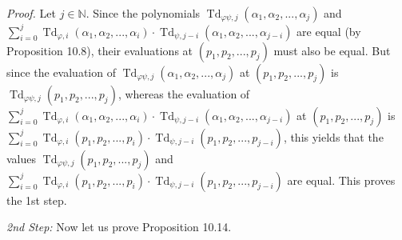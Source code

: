 \documentclass[numbers=enddot,12pt,final,onecolumn,notitlepage]{scrartcl}%
\begin{document}
\textit{Proof.} Let $j\in\mathbb{N}$. Since the polynomials
$\operatorname*{Td}\nolimits_{\varphi\psi,j}\left(  \alpha_{1},\alpha
_{2},...,\alpha_{j}\right)  $ and $\sum\limits_{i=0}^{j}\operatorname*{Td}%
\nolimits_{\varphi,i}\left(  \alpha_{1},\alpha_{2},...,\alpha_{i}\right)
\cdot\operatorname*{Td}\nolimits_{\psi,j-i}\left(  \alpha_{1},\alpha
_{2},...,\alpha_{j-i}\right)  $ are equal (by Proposition 10.8), their
evaluations at $\left(  p_{1},p_{2},...,p_{j}\right)  $ must also be equal.
But since the evaluation of $\operatorname*{Td}\nolimits_{\varphi\psi
,j}\left(  \alpha_{1},\alpha_{2},...,\alpha_{j}\right)  $ at $\left(
p_{1},p_{2},...,p_{j}\right)  $ is $\operatorname*{Td}\nolimits_{\varphi
\psi,j}\left(  p_{1},p_{2},...,p_{j}\right)  $, whereas the evaluation of
$\sum\limits_{i=0}^{j}\operatorname*{Td}\nolimits_{\varphi,i}\left(
\alpha_{1},\alpha_{2},...,\alpha_{i}\right)  \cdot\operatorname*{Td}%
\nolimits_{\psi,j-i}\left(  \alpha_{1},\alpha_{2},...,\alpha_{j-i}\right)  $
at $\left(  p_{1},p_{2},...,p_{j}\right)  $ is $\sum\limits_{i=0}%
^{j}\operatorname*{Td}\nolimits_{\varphi,i}\left(  p_{1},p_{2},...,p_{i}%
\right)  \cdot\operatorname*{Td}\nolimits_{\psi,j-i}\left(  p_{1}%
,p_{2},...,p_{j-i}\right)  $, this yields that the values $\operatorname*{Td}%
\nolimits_{\varphi\psi,j}\left(  p_{1},p_{2},...,p_{j}\right)  $ and
$\sum\limits_{i=0}^{j}\operatorname*{Td}\nolimits_{\varphi,i}\left(
p_{1},p_{2},...,p_{i}\right)  \cdot\operatorname*{Td}\nolimits_{\psi
,j-i}\left(  p_{1},p_{2},...,p_{j-i}\right)  $ are equal. This proves the 1st step.

\textit{2nd Step:} Now let us prove Proposition 10.14.
\end{document}
